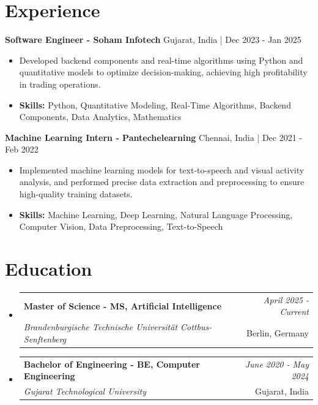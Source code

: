 \documentclass[a4paper,11pt]{article}
\makeatletter
\newcommand{\resumeSubheading}[4]{
\vspace{0.5mm}\item
    \begin{tabular*}{\linewidth}[t]{l@{\extracolsep{\fill}}r}
        \textbf{#1} & \textit{\footnotesize{#4}} \\
        \textit{\footnotesize{#3}} &  \footnotesize{#2}\\
    \end{tabular*}
    \vspace{-2.4mm}
}
\makeatother
\begin{document}
\section{\textbf{Experience}}


\vspace{1mm}
  \textbf{Software Engineer - Soham Infotech} \hfill Gujarat, India | Dec 2023 - Jan 2025
\vspace{-1.5mm} %
\begin{itemize}
  \item Developed backend components and real-time algorithms using Python and quantitative models to optimize decision-making, achieving high profitability in trading operations.

\vspace{-2mm}
  \item \textbf{Skills:} Python, Quantitative Modeling, Real-Time Algorithms, Backend Components, Data Analytics, Mathematics
\end{itemize}

\vspace{1mm}
  \textbf{Machine Learning Intern - Pantechelearning} \hfill Chennai, India | Dec 2021 - Feb 2022
\vspace{-1.5mm} %
\begin{itemize}
  \item Implemented machine learning models for text-to-speech and visual activity analysis, and performed precise data extraction and preprocessing to ensure high-quality training datasets.
\vspace{-2mm}
  \item \textbf{Skills:} Machine Learning, Deep Learning, Natural Language Processing, Computer Vision, Data Preprocessing, Text-to-Speech
\end{itemize}\section{\textbf{Education}}
\vspace{-0.4mm}

\begin{itemize}[leftmargin=0.15in, label={}]
\resumeSubheading
{Master of Science - MS, Artificial Intelligence }{Berlin, Germany}
{Brandenburgische Technische Universität Cottbus-Senftenberg  }{April 2025 - Current}

\vspace{1.0mm} %
\resumeSubheading
{Bachelor of Engineering - BE, Computer Engineering  }{Gujarat, India}
{Gujarat Technological University }{June 2020 - May 2024}

\end{itemize}
\end{document}
